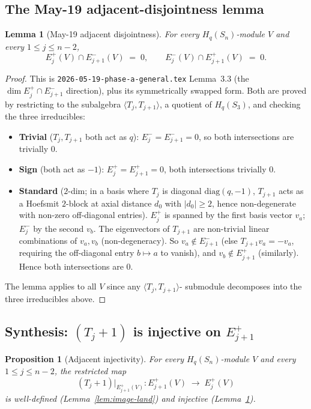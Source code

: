 \documentclass[11pt]{article}
\newtheorem{lemma}[theorem]{Lemma}
\newtheorem{proposition}[theorem]{Proposition}
\theoremstyle{definition}
\begin{document}
\subsection{The May-19 adjacent-disjointness lemma}

\begin{lemma}[May-19 adjacent disjointness]\label{lem:adj-disj}
For every $H_q(S_n)$-module $V$ and every $1 \le j \le n - 2$,
\[
   E_j^+(V) \cap E_{j+1}^-(V) \;=\; 0,
   \qquad
   E_j^-(V) \cap E_{j+1}^+(V) \;=\; 0.
\]
\end{lemma}

\begin{proof}
This is \texttt{2026-05-19-phase-a-general.tex} Lemma~3.3 (the
$\dim E_j^+ \cap E_{j+1}^-$ direction), plus its symmetrically swapped
form. Both are proved by restricting to the subalgebra
$\langle T_j, T_{j+1}\rangle$, a quotient of $H_q(S_3)$, and checking
the three irreducibles:
\begin{itemize}[leftmargin=2em,topsep=0.2em,itemsep=0.1em]
\item \textbf{Trivial} ($T_j, T_{j+1}$ both act as $q$): $E^-_j =
E^-_{j+1} = 0$, so both intersections are trivially $0$.
\item \textbf{Sign} (both act as $-1$): $E^+_j = E^+_{j+1} = 0$, both
intersections trivially $0$.
\item \textbf{Standard} ($2$-dim; in a basis where $T_j$ is diagonal
$\mathrm{diag}(q, -1)$, $T_{j+1}$ acts as a Hoefsmit $2$-block at axial
distance $d_0$ with $|d_0| \ge 2$, hence non-degenerate with non-zero
off-diagonal entries). $E_j^+$ is spanned by the first basis vector
$v_a$; $E_j^-$ by the second $v_b$. The eigenvectors of $T_{j+1}$ are
non-trivial linear combinations of $v_a, v_b$ (non-degeneracy). So
$v_a \notin E_{j+1}^-$ (else $T_{j+1} v_a = -v_a$, requiring the
off-diagonal entry $b \mapsto a$ to vanish), and $v_b \notin E_{j+1}^+$
(similarly). Hence both intersections are $0$.
\end{itemize}
The lemma applies to all $V$ since any $\langle T_j, T_{j+1}\rangle$-
submodule decomposes into the three irreducibles above.
\end{proof}

\subsection{Synthesis: $(T_j+1)$ is injective on $E_{j+1}^+$}

\begin{proposition}[Adjacent injectivity]\label{prop:adj-inj}
For every $H_q(S_n)$-module $V$ and every $1 \le j \le n - 2$, the
restricted map
\[
   (T_j + 1)\big|_{E_{j+1}^+(V)} : E_{j+1}^+(V) \;\to\; E_j^+(V)
\]
is well-defined (Lemma~\ref{lem:image-land}) and \emph{injective}
(Lemma~\ref{lem:adj-disj}).
\end{proposition}
\end{document}
